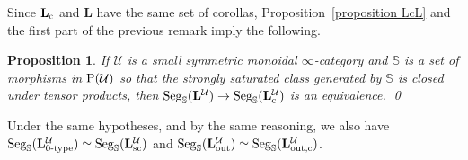 \documentclass{amsart}
\numberwithin{theorem}{subsection}
\newtheorem{proposition}[theorem]{Proposition}
\theoremstyle{definition}
\newcommand{\xU}{\mathcal{U}}
\newcommand{\Pre}{\name{P}}
\newcommand{\name}[1]{\ensuremath{\text{\textup{#1}}}}
\newcommand{\levelg}{\mathbf{L}}
\newcommand{\levelU}{\levelg^\xU}
\newcommand{\levelgconn}{\levelg_{\name{c}}}
\newcommand{\levelcU}{\levelgconn^{\xU}}
\newcommand{\Seg}{\name{Seg}}
\newcommand{\SegS}{\Seg_{\mathbb{S}}}
\begin{document}
Since $\levelgconn$ and $\levelg$ have the same set of corollas, Proposition~\ref{proposition LcL} and the first part of the previous remark imply the following.

\begin{proposition}
\label{prop LcL S}
If $\xU$ is a small symmetric monoidal $\infty$-category and $\mathbb{S}$ is a set of morphisms in $\Pre(\xU)$ so that the strongly saturated class generated by $\mathbb{S}$ is closed under tensor products, then $\SegS(\levelU)\to \SegS(\levelcU)$ is an equivalence. \qed
\end{proposition}
\noindent
Under the same hypotheses, and by the same reasoning, we also have $\SegS(\levelg_{\name{0-type}}^\xU) \simeq \SegS(\levelg_{\name{sc}}^\xU)$ and $\SegS(\levelg_{\name{out}}^\xU) \simeq \SegS(\levelg_{\name{out,c}}^\xU)$.
\end{document}

